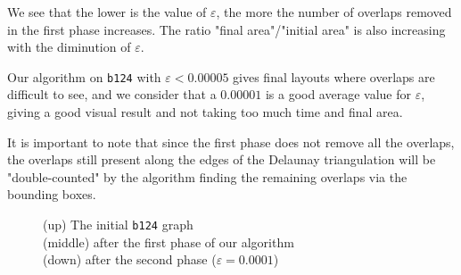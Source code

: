 \documentclass[12pt]{report}
\begin{document}
\bigskip
We see that the lower is the value of $\varepsilon$, the more the number of overlaps removed in the first phase increases. The ratio "final area"/"initial area" is also increasing with the diminution of $\varepsilon$.

Our algorithm on \texttt{b124} with $\varepsilon < 0.00005$ gives final layouts where overlaps are difficult to see, and we consider that a $0.00001$ is a good average value for $\varepsilon$, giving a good visual result and not taking too much time and final area.

\bigskip
It is important to note that since the first phase does not remove all the overlaps, the overlaps still present along the edges of the Delaunay triangulation will be "double-counted" by the algorithm finding the remaining overlaps via the bounding boxes. 

\begin{figure}[h]
	\center
  \setlength\fboxsep{5pt}
  \setlength\fboxrule{0.5pt}
  
  
  
  \caption{(up) The initial \texttt{b124} graph \\ (middle) after the first phase of our algorithm \\ (down) after the second phase ($\varepsilon = 0.0001$)}
  \label{b124}
\end{figure}
\end{document}

